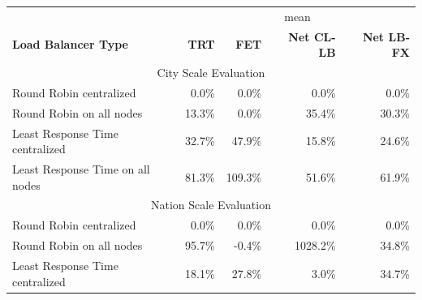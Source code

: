 \documentclass[draft,final]{vutinfth} %
\begin{document}
\begin{table}[]
\begin{tabular}{lrrrr}
\hline
                                 & \multicolumn{4}{c}{mean}                                                                                                                              \\
\textbf{Load Balancer Type}      & \multicolumn{1}{r}{\textbf{TRT}} & \multicolumn{1}{r}{\textbf{FET}} & \multicolumn{1}{r}{\textbf{Net CL-LB}} & \multicolumn{1}{r}{\textbf{Net LB-FX}} \\ \hline
\multicolumn{5}{c}{City Scale Evaluation}                                                                                                                                                \\ \hline
Round Robin centralized          & 0.0\%                            & 0.0\%                            & 0.0\%                                  & 0.0\%                                  \\
Round Robin on all nodes         & 13.3\%                           & 0.0\%                            & 35.4\%                                 & 30.3\%                                 \\
Least Response Time centralized  & 32.7\%                           & 47.9\%                           & 15.8\%                                 & 24.6\%                                 \\
Least Response Time on all nodes & 81.3\%                           & 109.3\%                          & 51.6\%                                 & 61.9\%                                 \\ \hline
\multicolumn{5}{c}{Nation Scale Evaluation}                                                                                                                                              \\ \hline
Round Robin centralized          & 0.0\%                            & 0.0\%                            & 0.0\%                                  & 0.0\%                                  \\
Round Robin on all nodes         & 95.7\%                           & -0.4\%                           & 1028.2\%                               & 34.8\%                                 \\
Least Response Time centralized  & 18.1\%                           & 27.8\%                           & 3.0\%                                  & 34.7\%                                 \\

\end{tabular}
\end{table}
\end{document}
